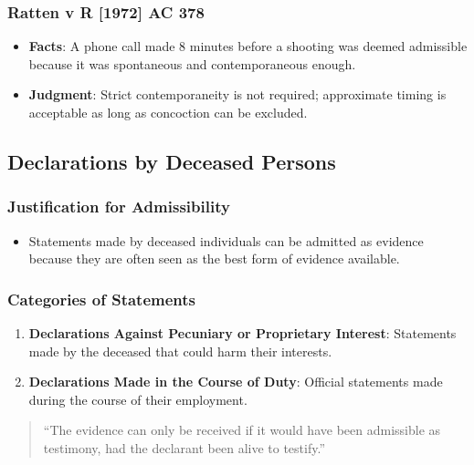 \subsubsection{Ratten v R {[}1972{]} AC
378}\label{ratten-v-r-1972-ac-378}

\begin{itemize}
\tightlist
\item
  \textbf{Facts}: A phone call made 8 minutes before a shooting was
  deemed admissible because it was spontaneous and contemporaneous
  enough.
\item
  \textbf{Judgment}: Strict contemporaneity is not required; approximate
  timing is acceptable as long as concoction can be excluded.
\end{itemize}

\subsection{  Declarations by Deceased
Persons}\label{declarations-by-deceased-persons}

\subsubsection{Justification for
Admissibility}\label{justification-for-admissibility}

\begin{itemize}
\tightlist
\item
  Statements made by deceased individuals can be admitted as evidence
  because they are often seen as the best form of evidence available.
\end{itemize}

\subsubsection{Categories of Statements}\label{categories-of-statements}

\begin{enumerate}
\def\labelenumi{\arabic{enumi}.}
\tightlist
\item
  \textbf{Declarations Against Pecuniary or Proprietary Interest}:
  Statements made by the deceased that could harm their interests.
\item
  \textbf{Declarations Made in the Course of Duty}: Official statements
  made during the course of their employment.
\end{enumerate}

\begin{quote}
``The evidence can only be received if it would have been admissible as
testimony, had the declarant been alive to testify.''
\end{quote}

